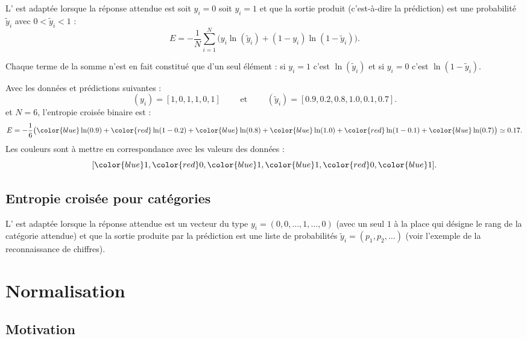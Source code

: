 \documentclass[11pt,class=report,crop=false]{standalone}
\begin{document}
L' est adaptée lorsque la réponse attendue est soit $y_i=0$ soit $y_i=1$ et que la sortie produit (c'est-à-dire la prédiction) est une probabilité $\widetilde y_i$ avec $0 < \widetilde y_i < 1$ :
$$E = -\frac{1}{N} \sum_{i=1}^N \big( y_i \ln(\widetilde y_i) + (1-y_i) \ln(1-\widetilde y_i)\big).$$
  
Chaque terme de la somme n'est en fait constitué que d'un seul élément : si
$y_i=1$ c'est  $\ln(\widetilde y_i)$ et si $y_i=0$ c'est $\ln(1-\widetilde y_i)$.

  
\begin{exemple}
Avec les données et prédictions suivantes :
$$(y_i) =  [1,0,1,1,0,1]
\qquad \text{ et } \qquad
(\widetilde y_i) = [0.9,0.2,0.8,1.0,0.1,0.7].
$$
et $N=6$, l'entropie croisée binaire est : 
$$E = -\frac{1}{6} \big( 
{\color{blue}\ln(0.9)} + {\color{red}\ln(1-0.2)} + {\color{blue}\ln(0.8)} + 
{\color{blue}\ln(1.0)} + {\color{red}\ln(1-0.1)} + {\color{blue}\ln(0.7)}
\big) \simeq 0.17.$$
Les couleurs sont à mettre en correspondance avec les valeurs des données :
$$[{\color{blue}1},{\color{red}0},{\color{blue}1},{\color{blue}1},{\color{red}0},{\color{blue}1}].$$
\end{exemple} 
    
    
\subsection{Entropie croisée pour catégories}

L' est adaptée lorsque la réponse attendue est un vecteur du type $y_i=(0,0,\ldots,1,\ldots,0)$ (avec un seul $1$ à la place qui désigne le rang de la catégorie attendue) et que la sortie produite par la prédiction est une liste de probabilités $\widetilde y_i = (p_1,p_2,\ldots)$ (voir l'exemple de la reconnaissance de chiffres).
 
 
 
\section{Normalisation}


\subsection{Motivation}
\end{document}
